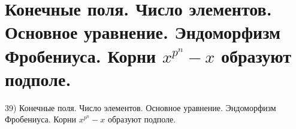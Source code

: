 \section{
 Конечные поля. Число элементов. Основное уравнение. Эндоморфизм Фробениуса. Корни $x^{p^n} - x$ образуют подполе.
}

39) Конечные поля. Число элементов. Основное уравнение. Эндоморфизм Фробениуса. Корни $x^{p^n} - x$ образуют подполе.
